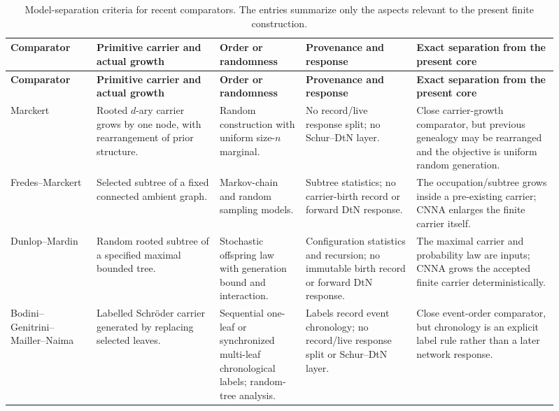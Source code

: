 \documentclass[11pt]{article}
\theoremstyle{remark}
\numberwithin{equation}{section}
\begin{document}
\begin{longtable}{>{\raggedright\arraybackslash}p{0.145\linewidth}>{\raggedright\arraybackslash}p{0.205\linewidth}>{\raggedright\arraybackslash}p{0.145\linewidth}>{\raggedright\arraybackslash}p{0.185\linewidth}>{\raggedright\arraybackslash}p{0.235\linewidth}}
\caption{Model-separation criteria for recent comparators. The entries summarize only the aspects relevant to the present finite construction.}\label{tab:recent-model-separation}\\
\toprule
\textbf{Comparator} & \textbf{Primitive carrier and actual growth} & \textbf{Order or randomness} & \textbf{Provenance and response} & \textbf{Exact separation from the present core}\\
\midrule
\endfirsthead
\toprule
\textbf{Comparator} & \textbf{Primitive carrier and actual growth} & \textbf{Order or randomness} & \textbf{Provenance and response} & \textbf{Exact separation from the present core}\\
\midrule
\endhead
Marckert~\cite{Marckert2023} & Rooted $d$-ary carrier grows by one node, with rearrangement of prior structure. & Random construction with uniform size-$n$ marginal. & No record/live response split; no Schur--DtN layer. & Close carrier-growth comparator, but previous genealogy may be rearranged and the objective is uniform random generation.\\
\hline
Fredes--Marckert~\cite{FredesMarckert2023} & Selected subtree of a fixed connected ambient graph. & Markov-chain and random sampling models. & Subtree statistics; no carrier-birth record or forward DtN response. & The occupation/subtree grows inside a pre-existing carrier; CNNA enlarges the finite carrier itself.\\
\hline
Dunlop--Mardin~\cite{DunlopMardin2022} & Random rooted subtree of a specified maximal bounded tree. & Stochastic offspring law with generation bound and interaction. & Configuration statistics and recursion; no immutable birth record or forward DtN response. & The maximal carrier and probability law are inputs; CNNA grows the accepted finite carrier deterministically.\\
\hline
Bodini--Genitrini--Mailler--Naima~\cite{BodiniGenitriniMaillerNaima2022} & Labelled Schr\"oder carrier generated by replacing selected leaves. & Sequential one-leaf or synchronized multi-leaf chronological labels; random-tree analysis. & Labels record event chronology; no record/live response split or Schur--DtN layer. & Close event-order comparator, but chronology is an explicit label rule rather than a later network response.\\

\end{longtable}
\end{document}
